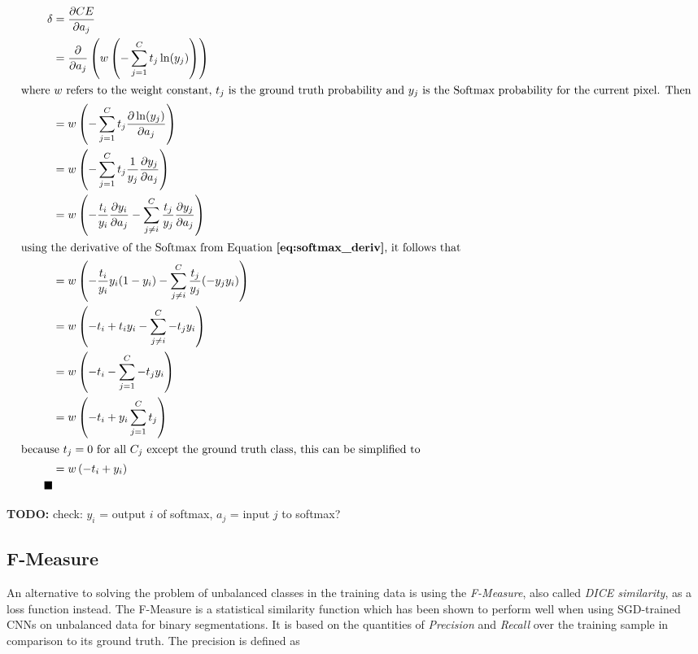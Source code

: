 \begin {align}
	\delta &= \frac{\partial CE}{\partial a_j} \\
		&= \frac{\partial}{\partial a_j} \left ( w \left ( - \sum \limits_{j=1}^{C} t_j \ln(y_j) \right ) \right ) \\ \intertext{where $w$ refers to the weight constant, $t_j$ is the ground truth probability and $y_j$ is the Softmax probability for the current pixel. Then}
		&= w \left ( - \sum \limits_{j=1}^{C} t_j \frac{\partial \ln(y_j)}{\partial a_j} \right ) \\
		&= w \left (- \sum \limits_{j=1}^{C} t_j \frac{1}{y_j} \frac{\partial y_j}{\partial a_j} \right ) \\
		&= w \left ( - \frac{t_i}{y_i} \frac{\partial y_i}{\partial a_j} - \sum \limits_{j \neq i}^{C} \frac{t_j}{y_j} \frac{\partial y_j}{\partial a_j} \right ) \\ \intertext{using the derivative of the Softmax from Equation \textbf{\ref{eq:softmax_deriv}}, it follows that}
		&= w \left ( - \frac{t_i}{y_i} y_i (1 - y_i) - \sum \limits_{j \neq i}^{C} \frac{t_j}{y_j} (- y_j y_i) \right ) \\
		&= w \left ( - t_i + t_i y_i - \sum \limits_{j \neq i}^{C} - t_j y_i \right ) \\
		&= w \left ( - t_i - \sum \limits_{j=1}^{C} - t_j y_i  \right ) \\
		&= w \left ( - t_i + y_i \sum \limits_{j=1}^{C} t_j \right ) \\ \intertext{because $t_j = 0$ for all $C_j$ except the ground truth class, this can be simplified to} 
		&= w \left (- t_i + y_i \right ) \\ \tag*{$\blacksquare$} 
\end {align}

\textbf{TODO:} check: $y_i$ = output $i$ of softmax, $a_j$ = input $j$ to softmax?\\




		\subsection{F-Measure}
\label{subsec:fmeasure}

An alternative to solving the problem of unbalanced classes in the training data is using the \textit{F-Measure}, also called \textit{DICE similarity}, as a loss function instead. The F-Measure is a statistical similarity function which has been shown to perform well when using SGD-trained CNNs on unbalanced data for binary segmentations. \cite{fmeasure3, fmeasure4, fmeasure5} It is based on the quantities of \textit{Precision} and \textit{Recall} over the training sample in comparison to its ground truth. The precision is defined as

